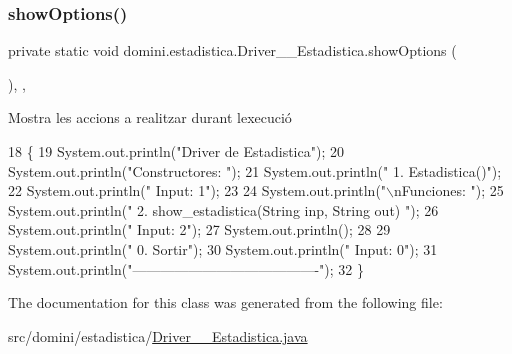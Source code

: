 \mbox{\label{classdomini_1_1estadistica_1_1Driver____Estadistica_ab42f06b8996094e10bd087ccf2f749e7}} 
\subsubsection{\texorpdfstring{show\+Options()}{showOptions()}}
{\footnotesize\ttfamily private static void domini.\+estadistica.\+Driver\+\_\+\+\_\+\+Estadistica.\+show\+Options (\begin{DoxyParamCaption}{ }\end{DoxyParamCaption})\hspace{0.3cm}{\ttfamily [inline]}, {\ttfamily [static]}, {\ttfamily [private]}}



Mostra les accions a realitzar durant l\textquotesingle{}execució 


\begin{DoxyCode}
18                                      \{
19         System.out.println(\textcolor{stringliteral}{"Driver de Estadistica"});
20         System.out.println(\textcolor{stringliteral}{"Constructores: "});
21         System.out.println(\textcolor{stringliteral}{"     1. Estadistica()"});
22         System.out.println(\textcolor{stringliteral}{"     Input: 1"});
23 
24         System.out.println(\textcolor{stringliteral}{"\(\backslash\)nFunciones: "});
25         System.out.println(\textcolor{stringliteral}{"     2. show\_estadistica(String inp, String out) "});
26         System.out.println(\textcolor{stringliteral}{"     Input: 2"});
27         System.out.println();
28 
29         System.out.println(\textcolor{stringliteral}{"     0. Sortir"});
30         System.out.println(\textcolor{stringliteral}{"     Input: 0"});
31         System.out.println(\textcolor{stringliteral}{"----------------------------------------"});
32     \}
\end{DoxyCode}


The documentation for this class was generated from the following file\+:\begin{DoxyCompactItemize}
\item 
src/domini/estadistica/\hyperlink{Driver____Estadistica_8java}{Driver\+\_\+\+\_\+\+Estadistica.\+java}\end{DoxyCompactItemize}
